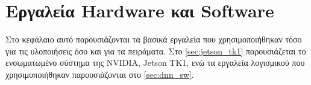 \chapter{Εργαλεία Hardware και Software}
\label{chapter:tools}

Στο κεφάλαιο αυτό παρουσιάζονται τα βασικά εργαλεία που
χρησιμοποιήθηκαν τόσο για τις υλοποιήσεις όσο και για τα πειράματα.
Στο \autoref{sec:jetson_tk1} παρουσιάζεται το ενσωματωμένο σύστημα
της NVIDIA, Jetson TK1, ενώ τα εργαλεία λογισμικού που χρησιμοποιήθηκαν
παρουσιάζονται στο \autoref{sec:dnn_sw}.




